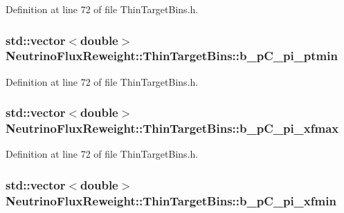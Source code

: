 Definition at line 72 of file Thin\-Target\-Bins.\-h.

\hypertarget{class_neutrino_flux_reweight_1_1_thin_target_bins_acb1a68d39331ba13d8f166fecc4df7d1}{
\subsubsection[{b\-\_\-p\-C\-\_\-pi\-\_\-ptmin}]{\setlength{\rightskip}{0pt plus 5cm}std\-::vector$<$double$>$ Neutrino\-Flux\-Reweight\-::\-Thin\-Target\-Bins\-::b\-\_\-p\-C\-\_\-pi\-\_\-ptmin}}\label{class_neutrino_flux_reweight_1_1_thin_target_bins_acb1a68d39331ba13d8f166fecc4df7d1}


Definition at line 72 of file Thin\-Target\-Bins.\-h.

\hypertarget{class_neutrino_flux_reweight_1_1_thin_target_bins_a14609f2e58a1c8a7a480e212508dc556}{
\subsubsection[{b\-\_\-p\-C\-\_\-pi\-\_\-xfmax}]{\setlength{\rightskip}{0pt plus 5cm}std\-::vector$<$double$>$ Neutrino\-Flux\-Reweight\-::\-Thin\-Target\-Bins\-::b\-\_\-p\-C\-\_\-pi\-\_\-xfmax}}\label{class_neutrino_flux_reweight_1_1_thin_target_bins_a14609f2e58a1c8a7a480e212508dc556}


Definition at line 72 of file Thin\-Target\-Bins.\-h.

\hypertarget{class_neutrino_flux_reweight_1_1_thin_target_bins_a2bab7b871bace2bd4d351c4355d94c4e}{
\subsubsection[{b\-\_\-p\-C\-\_\-pi\-\_\-xfmin}]{\setlength{\rightskip}{0pt plus 5cm}std\-::vector$<$double$>$ Neutrino\-Flux\-Reweight\-::\-Thin\-Target\-Bins\-::b\-\_\-p\-C\-\_\-pi\-\_\-xfmin}}\label{class_neutrino_flux_reweight_1_1_thin_target_bins_a2bab7b871bace2bd4d351c4355d94c4e}


